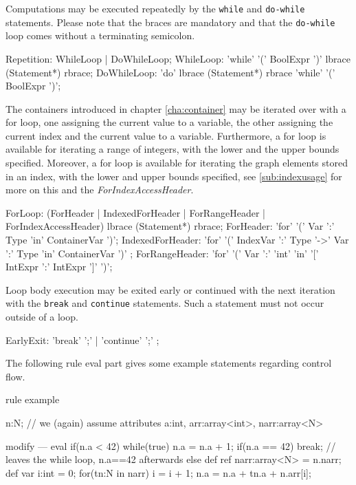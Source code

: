 Computations may be executed repeatedly by the \texttt{while} and \texttt{do-while} statements. Please note that the braces are mandatory and that the \texttt{do-while} loop comes without a terminating semicolon.

\begin{rail} 
  Repetition: WhileLoop | DoWhileLoop;
	WhileLoop: 'while' '(' BoolExpr ')' lbrace (Statement*) rbrace;
	DoWhileLoop: 'do' lbrace (Statement*) rbrace 'while' '(' BoolExpr ')';
\end{rail}


The containers introduced in chapter \ref{cha:container} may be iterated over with a for loop, one assigning the current value to a variable, the other assigning the current index and the current value to a variable.
Furthermore, a for loop is available for iterating a range of integers, with the lower and the upper bounds specified.
Moreover, a for loop is available for iterating the graph elements stored in an index, with the lower and upper bounds specified, see \ref{sub:indexusage} for more on this and the \emph{ForIndexAccessHeader}.
\begin{rail}
  ForLoop: (ForHeader | IndexedForHeader | ForRangeHeader | ForIndexAccessHeader) lbrace (Statement*) rbrace;
  ForHeader: 'for' '(' Var ':' Type 'in' ContainerVar ')';
  IndexedForHeader: 'for' '(' IndexVar ':' Type '->' Var ':' Type 'in' ContainerVar ')' ;
  ForRangeHeader: 'for' '(' Var ':' 'int' 'in' '[' IntExpr ':' IntExpr ']' ')';
\end{rail}

Loop body execution may be exited early or continued with the next iteration with the \texttt{break} and \texttt{continue} statements. Such a statement must not occur outside of a loop.

\begin{rail} 
  EarlyExit: 
	'break' ';' |	'continue' ';'
	;
\end{rail}

\begin{example}
The following rule eval part gives some example statements regarding control flow.
  \begin{grgen}
rule example
{
  n:N; // we (again) assume attributes a:int, arr:array<int>, narr:array<N>
	
	modify {
	---
		eval {
			if(n.a < 42) {
				while(true) {
					n.a = n.a + 1;
					if(n.a == 42) {
						break; // leaves the while loop, n.a==42 afterwards
					}
				}
			} else {
				def ref narr:array<N> = n.narr;
				def var i:int = 0;
				for(tn:N in narr) {
					i = i + 1;
					n.a = n.a + tn.a + n.arr[i];
				}
			}
		}
	}
}
  \end{grgen}
\end{example}


